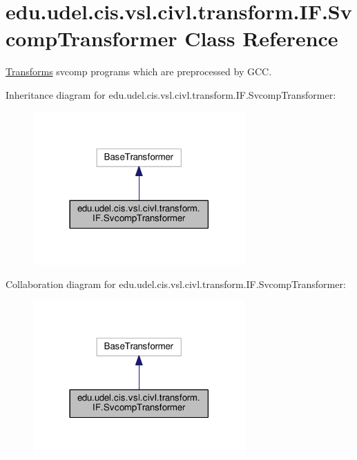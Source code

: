 \hypertarget{classedu_1_1udel_1_1cis_1_1vsl_1_1civl_1_1transform_1_1IF_1_1SvcompTransformer}{}\section{edu.\+udel.\+cis.\+vsl.\+civl.\+transform.\+I\+F.\+Svcomp\+Transformer Class Reference}
\label{classedu_1_1udel_1_1cis_1_1vsl_1_1civl_1_1transform_1_1IF_1_1SvcompTransformer}


\hyperlink{classedu_1_1udel_1_1cis_1_1vsl_1_1civl_1_1transform_1_1IF_1_1Transforms}{Transforms} svcomp programs which are preprocessed by G\+C\+C.  




Inheritance diagram for edu.\+udel.\+cis.\+vsl.\+civl.\+transform.\+I\+F.\+Svcomp\+Transformer\+:
\nopagebreak
\begin{figure}[H]
\begin{center}
\leavevmode
\includegraphics[width=230pt]{classedu_1_1udel_1_1cis_1_1vsl_1_1civl_1_1transform_1_1IF_1_1SvcompTransformer__inherit__graph}
\end{center}
\end{figure}


Collaboration diagram for edu.\+udel.\+cis.\+vsl.\+civl.\+transform.\+I\+F.\+Svcomp\+Transformer\+:
\nopagebreak
\begin{figure}[H]
\begin{center}
\leavevmode
\includegraphics[width=230pt]{classedu_1_1udel_1_1cis_1_1vsl_1_1civl_1_1transform_1_1IF_1_1SvcompTransformer__coll__graph}
\end{center}
\end{figure}
